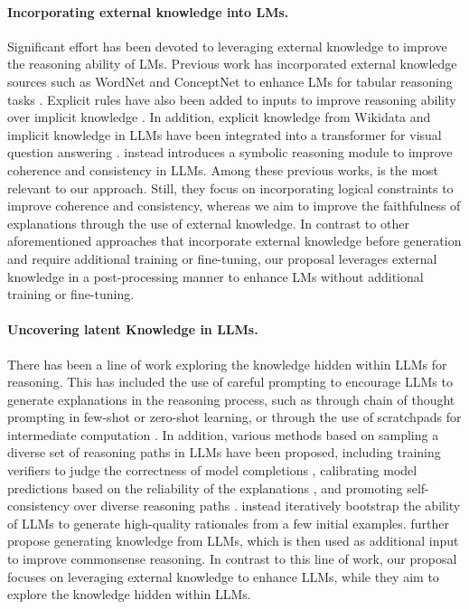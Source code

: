 \paragraph{Incorporating external knowledge into LMs.} Significant effort has been devoted to leveraging external knowledge to improve the reasoning ability of LMs. Previous work has incorporated external knowledge sources such as WordNet \cite{miller1995wordnet} and ConceptNet \cite{speer2017conceptnet} to enhance LMs for tabular reasoning tasks \cite{neeraja2021incorporating, varun2022trans}. Explicit rules have also been added to inputs to improve reasoning ability over implicit knowledge \cite{talmor2020leap}. In addition, explicit knowledge from Wikidata \cite{vrandevcic2014wikidata} and implicit knowledge in LLMs have been integrated into a transformer \cite{vaswani2017attention} for visual question answering \cite{gui2021kat}. \citet{nye2021improving} instead introduces a symbolic reasoning module to improve coherence and consistency in LLMs. Among these previous works, \citet{nye2021improving} is the most relevant to our approach. Still, they focus on incorporating logical constraints to improve coherence and consistency, whereas we aim to improve the faithfulness of explanations through the use of external knowledge. In contrast to other aforementioned approaches that incorporate external knowledge before generation and require additional training or fine-tuning, our proposal leverages external knowledge in a post-processing manner to enhance LMs without additional training or fine-tuning.

\paragraph{Uncovering latent Knowledge in LLMs.} There has been a line of work exploring the knowledge hidden within LLMs for reasoning. This has included the use of careful prompting to encourage LLMs to generate explanations in the reasoning process, such as through chain of thought prompting in few-shot \cite{wei2022chain} or zero-shot \cite{kojima2022large} learning, or through the use of scratchpads for intermediate computation \cite{nye2022show}. In addition, various methods based on sampling a diverse set of reasoning paths in LLMs have been proposed, including training verifiers to judge the correctness of model completions \cite{cobbe2021training}, calibrating model predictions based on the reliability of the explanations \cite{ye2022unreliability}, and promoting self-consistency over diverse reasoning paths \cite{wang2022self}. \citet{zelikman2022star} instead iteratively bootstrap the ability of LLMs to generate high-quality rationales from a few initial examples. \citet{liu2022generated} further propose generating knowledge from LLMs, which is then used as additional input to improve commonsense reasoning. In contrast to this line of work, our proposal focuses on leveraging external knowledge to enhance LLMs, while they aim to explore the knowledge hidden within LLMs.







